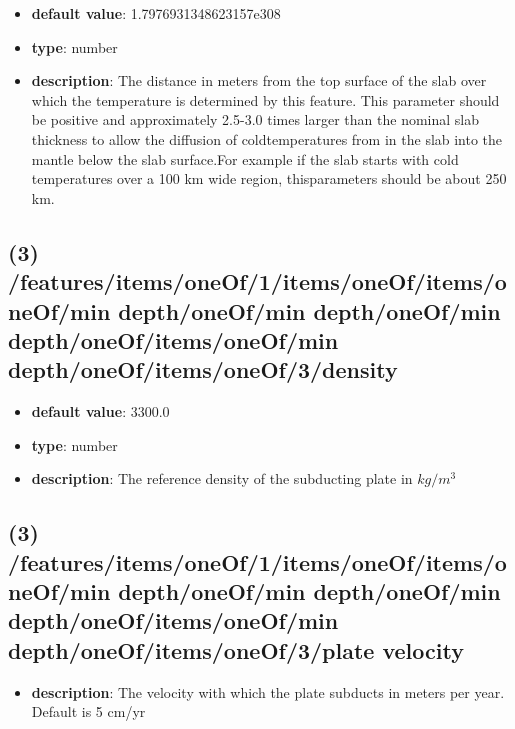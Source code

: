 \begin{itemize}[leftmargin=3em]\item {\bf default value}: 1.7976931348623157e308
\item {\bf type}: number
\item {\bf description}: The distance in meters from the top surface of the slab over which the temperature is determined by this feature. This parameter should be positive and approximately 2.5-3.0 times larger than the nominal slab thickness to allow the diffusion of coldtemperatures from in the slab into the mantle below the slab surface.For example if the slab starts with cold temperatures over a 100 km wide region, thisparameters should be about 250 km.
\end{itemize}\subsection{(3) /features/items/oneOf/1/items/oneOf/items/oneOf/min depth/oneOf/min depth/oneOf/min depth/oneOf/items/oneOf/min depth/oneOf/items/oneOf/3/density}
\begin{itemize}[leftmargin=3em]\item {\bf default value}: 3300.0
\item {\bf type}: number
\item {\bf description}: The reference density of the subducting plate in $kg/m^3$
\end{itemize}\subsection{(3) /features/items/oneOf/1/items/oneOf/items/oneOf/min depth/oneOf/min depth/oneOf/min depth/oneOf/items/oneOf/min depth/oneOf/items/oneOf/3/plate velocity}
\begin{itemize}[leftmargin=3em]\item {\bf description}: The velocity with which the plate subducts in meters per year. Default is 5 cm/yr
\end{itemize}
